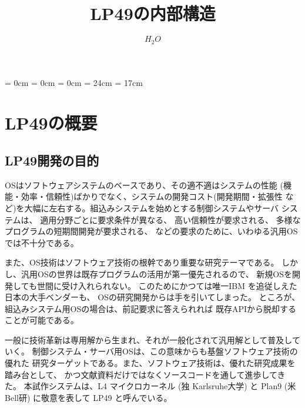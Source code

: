 


\topmargin = 0cm
\oddsidemargin = 0cm
\evensidemargin = 0cm
\textheight = 24cm
\textwidth = 17cm

\setcounter{secnumdepth}{2}



\title{\huge\bf
LP49の内部構造
}

\author{$H_2O$}



\maketitle


\tableofcontents
\part{LP49の概要}

\chapter{LP49開発の目的}
   
    OSはソフトウェアシステムのベースであり、その適不適はシステムの性能
    (機能・効率・信頼性)ばかりでなく、システムの開発コスト(開発期間・拡張性
    など)を大幅に左右する。組込みシステムを始めとする制御システムやサーバ
    システムは、 
     適用分野ごとに要求条件が異なる、 
     高い信頼性が要求される、 
     多様なプログラムの短期間開発が要求される、 
    などの要求のために、いわゆる汎用OSでは不十分である。

      また、OS技術はソフトウェア技術の根幹であり重要な研究テーマである。
    しかし、汎用OSの世界は既存プログラムの活用が第一優先されるので、
    新規OSを開発しても世間に受け入れられない。
    このためにかつては唯一IBM を追従しえた日本の大手ベンダーも、
    OSの研究開発からは手を引いてしまった。
    ところが、組込みシステム用OSの場合は、前記要求に答えられれば
    既存APIから脱却することが可能である。

      一般に技術革新は専用解から生まれ、それが一般化されて汎用解として普及していく。
      制御システム・サーバ用OSは、この意味からも基盤ソフトウェア技術の優れた
      研究ターゲットである。また、ソフトウェア技術は、優れた研究成果を踏み台として、
      かつ文献資料だけではなくソースコードを通して進歩してきた。
      本試作システムは、L4 マイクロカーネル (独 Karlsruhe大学) と
      Plan9 (米Bell研) に敬意を表して LP49 と呼んでいる。


